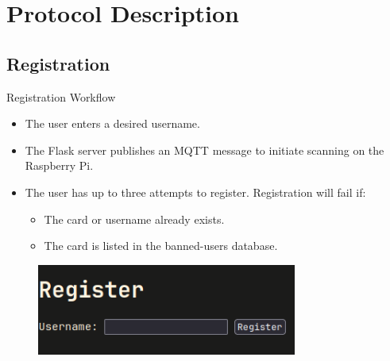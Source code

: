 \documentclass[t, aspectratio=169, 10pt]{beamer}
\begin{document}
\section{Protocol Description}
\subsection{Registration}
\begin{frame}{Registration Workflow}
    \begin{itemize}
        \item The user enters a desired username.
        \item The Flask server publishes an MQTT message to initiate scanning on the Raspberry Pi.
        \item The user has up to three attempts to register. Registration will fail if:
            \begin{itemize}
                \item The card or username already exists.
                \item The card is listed in the banned-users database.
            \end{itemize}
    \end{itemize}
    \begin{figure}
        \centering
        \includegraphics[height=3cm]{images/registration.png}
    \end{figure}
\end{frame}
\end{document}
